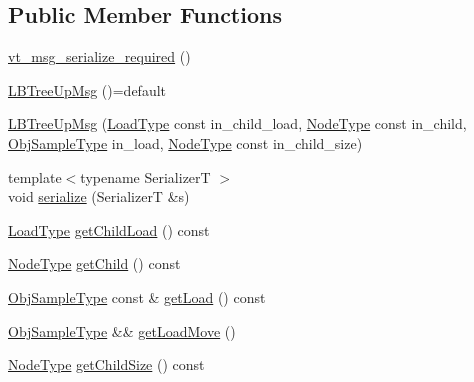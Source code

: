 \subsection*{Public Member Functions}
\begin{DoxyCompactItemize}
\item 
\hyperlink{structvt_1_1vrt_1_1collection_1_1lb_1_1_l_b_tree_up_msg_af56129ab0f46796fb31785e0a573cb5d}{vt\+\_\+msg\+\_\+serialize\+\_\+required} ()
\item 
\hyperlink{structvt_1_1vrt_1_1collection_1_1lb_1_1_l_b_tree_up_msg_a3dd039d297e1ea09939a13ad5a3722a3}{L\+B\+Tree\+Up\+Msg} ()=default
\item 
\hyperlink{structvt_1_1vrt_1_1collection_1_1lb_1_1_l_b_tree_up_msg_ac2ff0f6b4a047ab11a0cd372c54a141e}{L\+B\+Tree\+Up\+Msg} (\hyperlink{structvt_1_1vrt_1_1collection_1_1lb_1_1_l_b_tree_up_msg_a94e88fdd5142e26330a7feb8769de1bb}{Load\+Type} const in\+\_\+child\+\_\+load, \hyperlink{namespacevt_a866da9d0efc19c0a1ce79e9e492f47e2}{Node\+Type} const in\+\_\+child, \hyperlink{structvt_1_1vrt_1_1collection_1_1lb_1_1_hier_l_b_types_a597a60d517207b90e8c7984eac434e8f}{Obj\+Sample\+Type} in\+\_\+load, \hyperlink{namespacevt_a866da9d0efc19c0a1ce79e9e492f47e2}{Node\+Type} const in\+\_\+child\+\_\+size)
\item 
{\footnotesize template$<$typename SerializerT $>$ }\\void \hyperlink{structvt_1_1vrt_1_1collection_1_1lb_1_1_l_b_tree_up_msg_a6d948678b6361cbaa753d878b72fbce8}{serialize} (SerializerT \&s)
\item 
\hyperlink{structvt_1_1vrt_1_1collection_1_1lb_1_1_l_b_tree_up_msg_a94e88fdd5142e26330a7feb8769de1bb}{Load\+Type} \hyperlink{structvt_1_1vrt_1_1collection_1_1lb_1_1_l_b_tree_up_msg_a24c0c47c9e76945c75b7827ccdb8b446}{get\+Child\+Load} () const
\item 
\hyperlink{namespacevt_a866da9d0efc19c0a1ce79e9e492f47e2}{Node\+Type} \hyperlink{structvt_1_1vrt_1_1collection_1_1lb_1_1_l_b_tree_up_msg_a430d99ecbeb875f33ecd1b4c33c6ea5f}{get\+Child} () const
\item 
\hyperlink{structvt_1_1vrt_1_1collection_1_1lb_1_1_hier_l_b_types_a597a60d517207b90e8c7984eac434e8f}{Obj\+Sample\+Type} const  \& \hyperlink{structvt_1_1vrt_1_1collection_1_1lb_1_1_l_b_tree_up_msg_ab72366267d8219b83509f559ece96d75}{get\+Load} () const
\item 
\hyperlink{structvt_1_1vrt_1_1collection_1_1lb_1_1_hier_l_b_types_a597a60d517207b90e8c7984eac434e8f}{Obj\+Sample\+Type} \&\& \hyperlink{structvt_1_1vrt_1_1collection_1_1lb_1_1_l_b_tree_up_msg_aa5c9744fbb8557e3ec37846d9c8e09e7}{get\+Load\+Move} ()
\item 
\hyperlink{namespacevt_a866da9d0efc19c0a1ce79e9e492f47e2}{Node\+Type} \hyperlink{structvt_1_1vrt_1_1collection_1_1lb_1_1_l_b_tree_up_msg_a6d1dee8d6c40a169c16d1bbddb371478}{get\+Child\+Size} () const
\end{DoxyCompactItemize}

